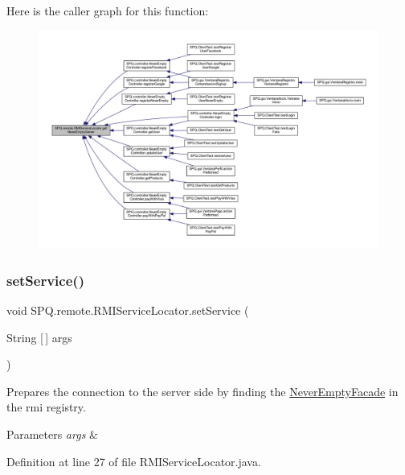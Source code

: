 Here is the caller graph for this function\+:
\nopagebreak
\begin{figure}[H]
\begin{center}
\leavevmode
\includegraphics[width=350pt]{class_s_p_q_1_1remote_1_1_r_m_i_service_locator_a19d79d8b31c278a127bf921895d889ae_icgraph}
\end{center}
\end{figure}
\mbox{\label{class_s_p_q_1_1remote_1_1_r_m_i_service_locator_ae4d529073f4b435fa3d0fedcaad0fc70}} 
\subsubsection{\texorpdfstring{set\+Service()}{setService()}}
{\footnotesize\ttfamily void S\+P\+Q.\+remote.\+R\+M\+I\+Service\+Locator.\+set\+Service (\begin{DoxyParamCaption}\item[{String \mbox{[}$\,$\mbox{]}}]{args }\end{DoxyParamCaption})}

Prepares the connection to the server side by finding the \mbox{\hyperlink{class_s_p_q_1_1remote_1_1_never_empty_facade}{Never\+Empty\+Facade}} in the rmi registry. 
\begin{DoxyParams}{Parameters}
{\em args} & \\
\hline
\end{DoxyParams}


Definition at line 27 of file R\+M\+I\+Service\+Locator.\+java.

